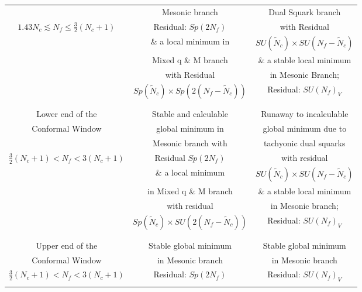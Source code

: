 \documentclass[11pt]{article}
\begin{document}
\begin{table}[htbp]
{\begin{tabular}{|c|c|c|}
 &
 Mesonic branch &Dual Squark branch\\
 $1.43N_c\lesssim N_{f} \leq  \frac{3}{2} (N_{c}+1)$& Residual: $Sp(2N_f)$&with Residual\\
 &\& a local minimum in & $SU(\widetilde{N}_c) \times SU(N_{f}-\widetilde{N}_c)$  \\
 &
 Mixed q \& M branch  &\& a stable local minimum \\
 &with Residual
 &in Mesonic Branch; \\
 &$Sp(\widetilde{N}_c)\times Sp(2(N_{f}-\widetilde{N}_c))$&Residual: $SU (N_f )_ V$
 \\
 &&\\
 \hline
 &&\\
 Lower end of the &Stable and calculable & Runaway to incalculable \\
 Conformal Window&global minimum in &global minimum due to \\
 & Mesonic branch with & tachyonic dual squarks\\
 $\frac{3}{2} (N_{c}+1) < N_{f} < 3(N_{c} + 1)$&Residual $Sp(2N_f)$&with residual\\
 &\& a local minimum&$SU(\widetilde{N}_c) \times SU(N_{f}-\widetilde{N}_c)$\\
 &in Mixed q \& M branch&\& a stable local minimum \\
 &with residual &in Mesonic branch; \\
 &$Sp(\widetilde{N}_c)\times SU(2(N_{f}-\widetilde{N}_c))$&Residual: $SU (N_f )_ V$\\
 &&\\
\hline
&&\\
Upper end of the &Stable global minimum&Stable global minimum\\
Conformal Window&in Mesonic branch&in Mesonic branch\\
$\frac{3}{2} (N_{c}+1) < N_{f} < 3(N_{c} + 1)$&Residual: $Sp(2N_f)$&Residual: $SU (N_f )_ V$\\
&&\\
\hline

\end{tabular}
}
\end{table}
\end{document}
